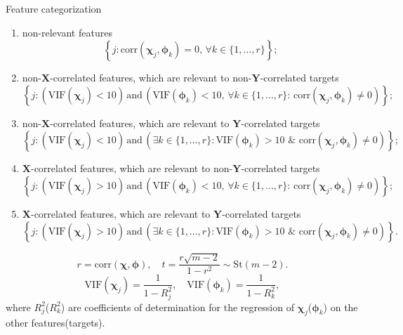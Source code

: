 \documentclass[9pt]{beamer}
\newcommand{\bY}{\mathbf{Y}}
\newcommand{\bX}{\mathbf{X}}
\newcommand{\bchi}{\boldsymbol{\chi}}
\newcommand{\bphi}{\boldsymbol{\phi}}
\begin{document}
\begin{frame}{Feature categorization}
\begin{enumerate}
	\item non-relevant features
	\[
	\left\{j: \text{corr}(\bchi_j, \bphi_k) = 0, \, \forall k \in \{1, \dots, r\}\right\};
	\]
	\item non-$\bX$-correlated features, which are relevant to non-$\bY$-correlated targets
	\[
	\left\{j: \left(\text{VIF}(\bchi_j) < 10\right) \, \text{and} \, \left(\text{VIF}(\bphi_k) < 10 , \, \forall k \in \{1, \dots, r\}: \,  \text{corr}(\bchi_j, \bphi_k) \neq 0 \right)\right\};
	\]
	\item non-$\bX$-correlated features, which are relevant to $\bY$-correlated targets
	\[
	\left\{j: \left(\text{VIF}(\bchi_j) < 10\right) \, \text{and} \, \left( \exists k \in \{1, \dots, r\}: \text{VIF}(\bphi_k) > 10 \,\, \& \,\, \text{corr}(\bchi_j, \bphi_k) \neq 0 \right)\right\};
	\]
	\item $\bX$-correlated features, which are relevant to non-$\bY$-correlated targets
	\[
	\left\{j: \left(\text{VIF}(\bchi_j) > 10\right) \, \text{and} \, \left(\text{VIF}(\bphi_k) < 10 , \, \forall k \in \{1, \dots, r\}: \,  \text{corr}(\bchi_j, \bphi_k) \neq 0 \right)\right\};
	\]
	\item $\bX$-correlated features, which are relevant to $\bY$-correlated targets
	\[
	\left\{j: \left(\text{VIF}(\bchi_j) > 10\right) \, \text{and} \, \left( \exists k \in \{1, \dots, r\}: \text{VIF}(\bphi_k) > 10 \,\, \& \,\, \text{corr}(\bchi_j, \bphi_k) \neq 0 \right)\right\}.
	\]
\end{enumerate}

\[
r = \text{corr} (\bchi, \bphi), \quad t = \frac{r \sqrt{m - 2}}{1 - r^2} \sim \text{St} (m - 2).
\]
\[
\text{VIF}(\bchi_j) = \frac{1}{1 - R_j^2}, \quad \text{VIF}(\bphi_k) = \frac{1}{1 - R_k^2},
\]
where $R_j^2$($R_k^2$) are coefficients of determination for the regression of $\bchi_j$($\bphi_k$) on the other features(targets).
\end{frame}
\end{document}
